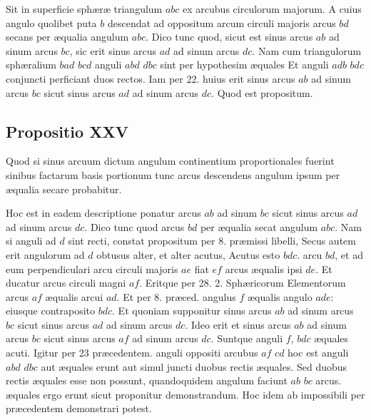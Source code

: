 \documentclass[11pt,a4paper]{article}
\begin{document}
Sit in superficie sphæræ triangulum $abc$ ex arcubus circulorum
majorum. A cuius angulo quolibet puta $b$ descendat ad oppositum
arcum circuli majoris arcus $bd$ secans per æqualia angulum
$abc$. Dico tunc quod, sicut est sinus arcus $ab$ ad sinum arcus
$bc$, sic erit sinus arcus $ad$ ad sinum arcus $dc$. Nam cum triangulorum
sphæralium $bad$ $bcd$ anguli $abd$ $dbc$ sint per hypothesim æquales
Et anguli $adb$ $bdc$ conjuncti perficiant duos rectos. Iam per 22.
huius erit sinus arcus $ab$ ad sinum arcus $bc$ sicut sinus arcus
$ad$ ad sinum arcus $dc$. Quod est propositum.

\subsection*{Propositio XXV}

Quod si sinus arcuum dictum angulum continentium
proportionales fuerint sinibus factarum basis portionum
tunc arcus descendens angulum ipsum per æqualia secare
probabitur.

Hoc est in eadem descriptione ponatur arcus $ab$ ad sinum
$bc$ sicut sinus arcus $ad$ ad sinum arcus $dc$. Dico tunc quod arcus
$bd$ per æqualia secat angulum $abc$. Nam si anguli ad $d$
sint recti, constat propositum per 8. præmissi libelli, Secus
autem erit angulorum ad $d$ obtusus alter, et alter acutus,
Acutus esto $bdc$.  arcu $bd$, et ad eum perpendiculari
arcu circuli majoris $ae$ fiat $ef$ arcus æqualis ipsi $de$. Et ducatur
arcus circuli magni $af$. Eritque per 28. 2. Sphæricorum
Elementorum arcus $af$ æqualis arcui $ad$. Et per 8. præced.
angulus $f$ æqualis angulo $ade$: eiusque contraposito $bdc$.
Et quoniam supponitur sinus arcus $ab$ ad sinum arcus $bc$
sicut sinus arcus $ad$ ad sinum arcus $dc$. Ideo erit et sinus
arcus $ab$ ad  sinum arcus $bc$ sicut sinus arcus $af$ ad
sinum arcus $dc$. Suntque anguli $f$, $bdc$ æquales acuti. Igitur
per 23 præcedentem. anguli oppositi arcubus $af$ $cd$ hoc est
anguli $abd$ $dbc$ aut æquales erunt aut simul juncti duobus
rectis æquales. Sed duobus rectis æquales esse non possunt,
quandoquidem angulum faciunt $ab$ $bc$ arcus. æquales ergo
erunt sicut proponitur demonstrandum. Hoc idem ab
impossibili per præcedentem demonstrari potest.
\end{document}
